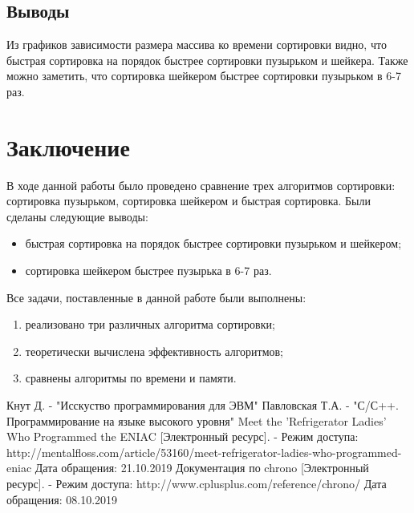 \documentclass[a4paper,12pt]{article}
\newcommand{\anonsection}[1]{\section*{#1}\addcontentsline{toc}{section}{#1}}
\begin{document}
\subsection{Выводы}

Из графиков зависимости размера массива ко времени сортировки видно, что быстрая сортировка
на порядок быстрее сортировки пузырьком и шейкера. Также можно заметить, что сортировка
шейкером быстрее сортировки пузырьком в 6-7 раз.

\newpage
\anonsection{Заключение}

В ходе данной работы было проведено сравнение трех алгоритмов сортировки: сортировка
пузырьком, сортировка шейкером и быстрая сортировка. Были сделаны следующие выводы:

\begin{itemize}
    \item быстрая сортировка на порядок быстрее сортировки пузырьком и шейкером;
    \item сортировка шейкером быстрее пузырька в 6-7 раз.
\end{itemize}

Все задачи, поставленные в данной работе были выполнены:

\begin{enumerate}
    \item реализовано три различных алгоритма сортировки;
    \item теоретически вычислена эффективность алгоритмов;
    \item сравнены алгоритмы по времени и памяти.
\end{enumerate}

\newpage
{}

\begin{thebibliography}{}
     Кнут Д. - "Исскуство программирования для ЭВМ"
     Павловская Т.А. - "С/С++. Программирование на языке высокого уровня"
     Meet the 'Refrigerator Ladies' Who Programmed the ENIAC [Электронный ресурс]. - Режим доступа: http://mentalfloss.com/article/53160/meet-refrigerator-ladies-who-programmed-eniac Дата обращения: 21.10.2019
     Документация по chrono [Электронный ресурс]. -  Режим доступа: http://www.cplusplus.com/reference/chrono/ Дата обращения: 08.10.2019
\end{thebibliography}
\end{document}
